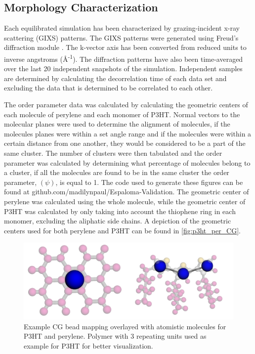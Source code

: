 \subsection{Morphology Characterization}
\par Each equilibrated simulation has been characterized by grazing-incident x-ray scattering (GIXS) patterns. The GIXS patterns were generated using Freud's diffraction module \citep{freud2020}. The k-vector axis has been converted from reduced units to inverse angstroms (\AA\textsuperscript{-1}). The diffraction patterns have also been time-averaged over the last 20 independent snapshots of the simulation. Independent samples are determined by calculating the decorrelation time of each data set and excluding the data that is determined to be correlated to each other. 
\par The order parameter data was calculated by calculating the geometric centers of each molecule of perylene and each monomer of P3HT. Normal vectors to the molecular planes were used to determine the alignment of molecules, if the molecules planes were within a set angle range and if the molecules were within a certain distance from one another, they would be considered to be a part of the same cluster. The number of clusters were then tabulated and the order parameter was calculated by determining what percentage of molecules belong to a cluster, if all the molecules are found to be in the same cluster the order parameter, \begin{math}(\psi)\end{math}, is equal to 1. The code used to generate these figures can be found at github.com/madilynpaul/Espaloma-Validation. The geometric center of perylene was calculated using the whole molecule, while the geometric center of P3HT was calculated by only taking into account the thiophene ring in each monomer, excluding the aliphatic side chains. A depiction of the geometric centers used for both perylene and P3HT can be found in \autoref{fig:p3ht_per_CG}.

\begin{figure}
    \centering
    \includegraphics[width=1\linewidth]{src/figures/FF_figs/per_p3ht_CG.png}
    \caption{Example CG bead mapping overlayed with atomistic molecules for P3HT and perylene. Polymer with 3 repeating units used as example for P3HT for better visualization.}
    \label{fig:p3ht_per_CG}
\end{figure}


